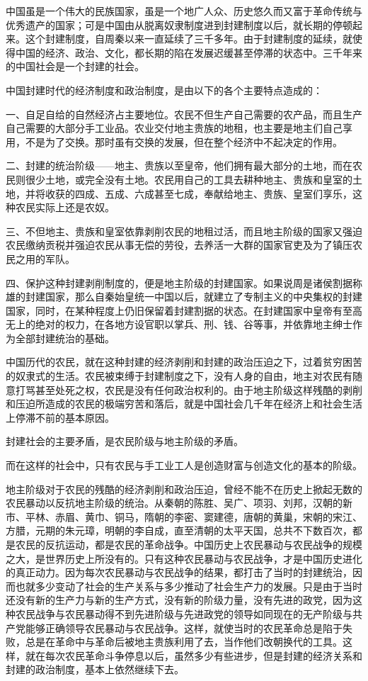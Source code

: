 \documentclass[UTF8, 12pt, a4paper]{ctexrep}
\begin{document}
中国虽是一个伟大的民族国家，虽是一个地广人众、历史悠久而又富于革命传统与优秀遗产的国家；可是中国由从脱离奴隶制度进到封建制度以后，就长期的停顿起来。这个封建制度，自周秦以来一直延续了三千多年。由于封建制度的延续，就使得中国的经济、政治、文化，都长期的陷在发展迟缓甚至停滞的状态中。三千年来的中国社会是一个封建的社会。

中国封建时代的经济制度和政治制度，是由以下的各个主要特点造成的：

一、自足自给的自然经济占主要地位。农民不但生产自己需要的农产品，而且生产自己需要的大部分手工业品。农业交付地主贵族的地租，也主要是地主们自己享用，不是为了交换。那时虽有交换的发展，但在整个经济中不起决定的作用。

二、封建的统治阶级——地主、贵族以至皇帝，他们拥有最大部分的土地，而在农民则很少土地，或完全没有土地。农民用自己的工具去耕种地主、贵族和皇室的土地，并将收获的四成、五成、六成甚至七成，奉献给地主、贵族、皇室们享乐，这种农民实际上还是农奴。

三、不但地主、贵族和皇室依靠剥削农民的地租过活，而且地主阶级的国家又强迫农民缴纳贡税并强迫农民从事无偿的劳役，去养活一大群的国家官吏及为了镇压农民之用的军队。

四、保护这种封建剥削制度的，便是地主阶级的封建国家。如果说周是诸侯割据称雄的封建国家，那么自秦始皇统一中国以后，就建立了专制主义的中央集权的封建国家，同时，在某种程度上仍旧保留着封建割据的状态。在封建国家中皇帝有至高无上的绝对的权力，在各地方设官职以掌兵、刑、钱、谷等事，并依靠地主绅士作为全部封建统治的基础。

中国历代的农民，就在这种封建的经济剥削和封建的政治压迫之下，过着贫穷困苦的奴隶式的生活。农民被束缚于封建制度之下，没有人身的自由，地主对农民有随意打骂甚至处死之权，农民是没有任何政治权利的。由于地主阶级这样残酷的剥削和压迫所造成的农民的极端穷苦和落后，就是中国社会几千年在经济上和社会生活上停滞不前的基本原因。

封建社会的主要矛盾，是农民阶级与地主阶级的矛盾。

而在这样的社会中，只有农民与手工业工人是创造财富与创造文化的基本的阶级。

地主阶级对于农民的残酷的经济剥削和政治压迫，曾经不能不在历史上掀起无数的农民暴动以反抗地主阶级的统治。从秦朝的陈胜、吴广、项羽、刘邦，汉朝的新市、平林、赤眉、黄巾、铜马，隋朝的李密、窦建德，唐朝的黄巢，宋朝的宋江、方腊，元期的朱元璋，明朝的李自成，直至清朝的太平天国，总共不下数百次，都是农民的反抗运动，都是农民的革命战争。中国历史上农民暴动与农民战争的规模之大，是世界历史上所没有的。只有这种农民暴动与农民战争，才是中国历史进化的真正动力。因为每次农民暴动与农民战争的结果，都打击了当时的封建统治，因而也就多少变动了社会的生产关系与多少推动了社会生产力的发展。只是由于当时还没有新的生产力与新的生产方式，没有新的阶级力量，没有先进的政党，因为这种农民战争与农民暴动得不到先进阶级与先进政党的领导如同现在的无产阶级与共产党能够正确领导农民暴动与农民战争。这样，就使当时的农民革命总是陷于失败，总是在革命中与革命后被地主贵族利用了去，当作他们改朝换代的工具。这样，就在每次农民革命斗争停息以后，虽然多少有些进步，但是封建的经济关系和封建的政治制度，基本上依然继续下去。
\end{document}

